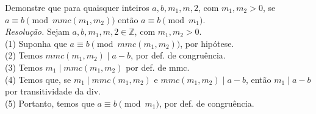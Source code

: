 Demonstre que para quaisquer inteiros $a, b, m_1, m,2$, com $m_1, m_2 > 0$, se $a \equiv b \pmod{mmc(m_1, m_2)}$ então $a \equiv b \pmod{m_1}$. \\
\emph{Resolução.}
Sejam $a, b, m_1, m,2 \in \mathbb{Z}$, com $m_1, m_2 > 0$. \\
(1) Suponha que $a \equiv b \pmod{mmc(m_1, m_2)}$, por hipótese. \\
(2) Temos $mmc(m_1, m_2) \mid a - b$, por def. de congruência. \\
(3) Temos $m_1 \mid mmc(m_1, m_2)$ por def. de mmc. \\
(4) Temos que, se $m_1 \mid mmc(m_1, m_2)$ e $mmc(m_1, m_2) \mid a - b$, então $m_1 \mid a - b$ por transitividade da div. \\
(5) Portanto, temos que $a \equiv b \pmod{m_1}$, por def. de congruência. \\

